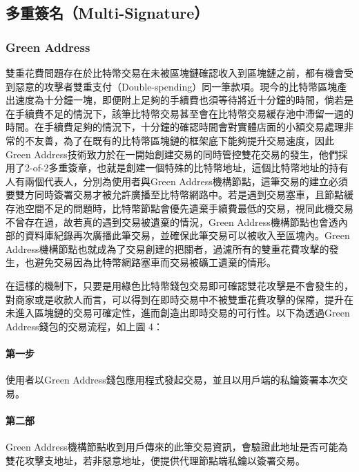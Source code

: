 		\subsection{多重簽名（Multi-Signature）}
		 	\subsubsection{Green Address}
		 	雙重花費問題存在於比特幣交易在未被區塊鏈確認收入到區塊鏈之前，都有機會受到惡意的攻擊者雙重支付（Double-spending）\supercite{decker2013information}同一筆款項。現今的比特幣區塊產出速度為十分鐘一塊，即便附上足夠的手續費也須等待將近十分鐘的時間，倘若是在手續費不足的情況下，該筆比特幣交易甚至會在比特幣交易緩存池中滯留一週的時間。在手續費足夠的情況下，十分鐘的確認時間會對實體店面的小額交易處理非常的不友善，為了在既有的比特幣區塊鏈的框架底下能夠提升交易速度，因此Green Address技術致力於在一開始創建交易的同時管控雙花交易的發生，他們採用了2-of-2多重簽章，也就是創建一個特殊的比特幣地址，這個比特幣地址的持有人有兩個代表人，分別為使用者與Green Address機構節點，這筆交易的建立必須要雙方同時簽署交易才被允許廣播至比特幣網路中。若是遇到交易塞車，且節點緩存池空間不足的問題時，比特幣節點會優先遺棄手續費最低的交易，視同此機交易不曾存在過，故若真的遇到交易被遺棄的情況，Green Address機構節點也會透內部的資料庫紀錄再次廣播此筆交易，並確保此筆交易可以被收入至區塊內。Green Address機構節點也就成為了交易創建的把關者，過濾所有的雙重花費攻擊的發生，也避免交易因為比特幣網路塞車而交易被礦工遺棄的情形。

		 	在這樣的機制下，只要是用綠色比特幣錢包交易即可確認雙花攻擊是不會發生的，對商家或是收款人而言，可以得到在即時交易中不被雙重花費攻擊的保障，提升在未進入區塊鏈的交易可確定性，進而創造出即時交易的可行性。以下為透過Green Address錢包的交易流程，如上圖 4：

		 	\paragraph{第一步}使用者以Green Address錢包應用程式發起交易，並且以用戶端的私鑰簽署本次交易。
		 	\paragraph{第二部}Green Address機構節點收到用戶傳來的此筆交易資訊，會驗證此地址是否可能為雙花攻擊支地址，若非惡意地址，便提供代理節點端私鑰以簽署交易。
